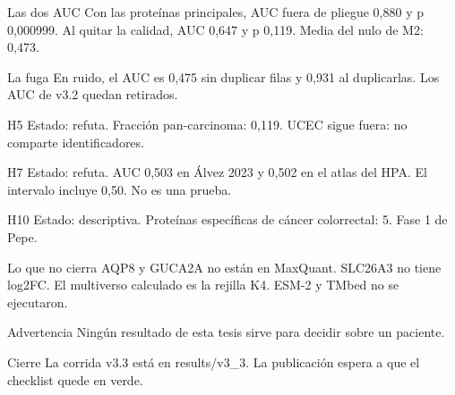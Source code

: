 \documentclass{beamer}
\begin{document}
\begin{frame}{Las dos AUC}
Con las proteínas principales, AUC fuera de pliegue 0,880 y p 0,000999. Al quitar la calidad, AUC 0,647 y p 0,119. Media del nulo de M2: 0,473.
\end{frame}

\begin{frame}{La fuga}
En ruido, el AUC es 0,475 sin duplicar filas y 0,931 al duplicarlas. Los AUC de v3.2 quedan retirados.
\end{frame}

\begin{frame}{H5}
Estado: refuta. Fracción pan-carcinoma: 0,119. UCEC sigue fuera: no comparte identificadores.
\end{frame}

\begin{frame}{H7}
Estado: refuta. AUC 0,503 en Álvez 2023 y 0,502 en el atlas del HPA. El intervalo incluye 0,50. No es una prueba.
\end{frame}

\begin{frame}{H10}
Estado: descriptiva. Proteínas específicas de cáncer colorrectal: 5. Fase 1 de Pepe.
\end{frame}

\begin{frame}{Lo que no cierra}
AQP8 y GUCA2A no están en MaxQuant. SLC26A3 no tiene log2FC. El multiverso calculado es la rejilla K4. ESM-2 y TMbed no se ejecutaron.
\end{frame}

\begin{frame}{Advertencia}
Ningún resultado de esta tesis sirve para decidir sobre un paciente.
\end{frame}

\begin{frame}{Cierre}
La corrida v3.3 está en results/v3\_3. La publicación espera a que el checklist quede en verde.
\end{frame}
\end{document}
